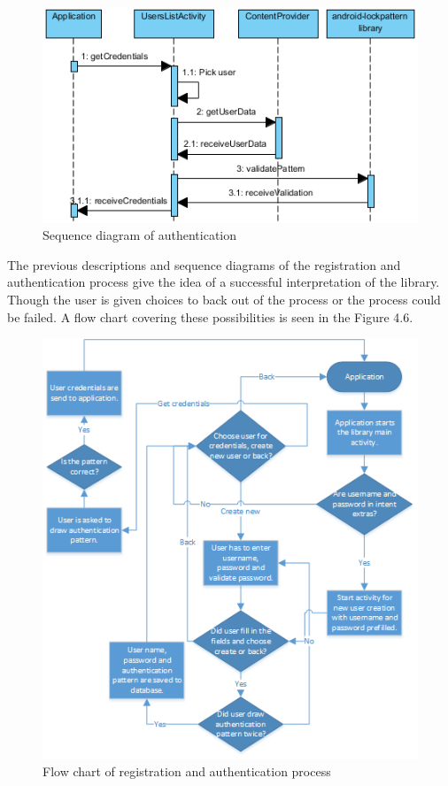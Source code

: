 \begin{figure}[h!]
\begin{center}
\includegraphics[scale=0.9]{images/sequencediagramauth.png}
\caption{Sequence diagram of authentication} \label{fig:sequence diagram} 
\end{center}
\end{figure}

\newpage
The previous descriptions and sequence diagrams of the registration and authentication process give the idea of a successful interpretation of the library. Though the user is given choices to back out of the process or the process could be failed. A flow chart covering these possibilities is seen in the Figure 4.6.

\begin{figure}[h!]
\begin{center}
\includegraphics[scale=1]{images/flowchart.png}
\caption{Flow chart of registration and authentication process} 
\label{fig:flow chart} 
\end{center}
\end{figure}

